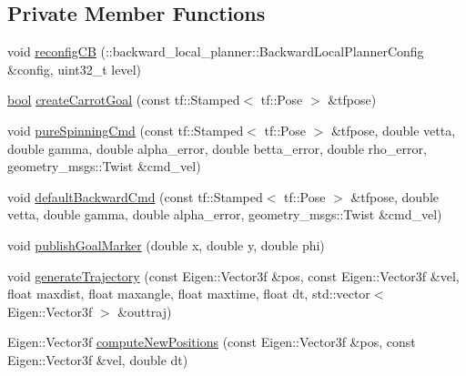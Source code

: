 \subsection*{Private Member Functions}
\begin{DoxyCompactItemize}
\item 
void \hyperlink{classmove__base__z__client_1_1backward__local__planner_1_1BackwardLocalPlanner_a9dfe3fd3fd7a0c8ec414a78e1300d09c}{reconfig\+CB} (\+::backward\+\_\+local\+\_\+planner\+::\+Backward\+Local\+Planner\+Config \&config, uint32\+\_\+t level)
\item 
\hyperlink{classbool}{bool} \hyperlink{classmove__base__z__client_1_1backward__local__planner_1_1BackwardLocalPlanner_a0a48c91cb8043aa15d01eec4931e8552}{create\+Carrot\+Goal} (const tf\+::\+Stamped$<$ tf\+::\+Pose $>$ \&tfpose)
\item 
void \hyperlink{classmove__base__z__client_1_1backward__local__planner_1_1BackwardLocalPlanner_a3b08865dc8e19750273d971336ecba3b}{pure\+Spinning\+Cmd} (const tf\+::\+Stamped$<$ tf\+::\+Pose $>$ \&tfpose, double vetta, double gamma, double alpha\+\_\+error, double betta\+\_\+error, double rho\+\_\+error, geometry\+\_\+msgs\+::\+Twist \&cmd\+\_\+vel)
\item 
void \hyperlink{classmove__base__z__client_1_1backward__local__planner_1_1BackwardLocalPlanner_a9f3977494d5f80884eb1a1d09b5b4673}{default\+Backward\+Cmd} (const tf\+::\+Stamped$<$ tf\+::\+Pose $>$ \&tfpose, double vetta, double gamma, double alpha\+\_\+error, geometry\+\_\+msgs\+::\+Twist \&cmd\+\_\+vel)
\item 
void \hyperlink{classmove__base__z__client_1_1backward__local__planner_1_1BackwardLocalPlanner_a691e565d33666d2f7004e791cae29b42}{publish\+Goal\+Marker} (double x, double y, double phi)
\item 
void \hyperlink{classmove__base__z__client_1_1backward__local__planner_1_1BackwardLocalPlanner_a5da53f29e43639a9af5ba3b640e6bf8c}{generate\+Trajectory} (const Eigen\+::\+Vector3f \&pos, const Eigen\+::\+Vector3f \&vel, float maxdist, float maxangle, float maxtime, float dt, std\+::vector$<$ Eigen\+::\+Vector3f $>$ \&outtraj)
\item 
Eigen\+::\+Vector3f \hyperlink{classmove__base__z__client_1_1backward__local__planner_1_1BackwardLocalPlanner_af91f457b97d26abf9b9e2cfcbeb9d7ed}{compute\+New\+Positions} (const Eigen\+::\+Vector3f \&pos, const Eigen\+::\+Vector3f \&vel, double dt)
\end{DoxyCompactItemize}
